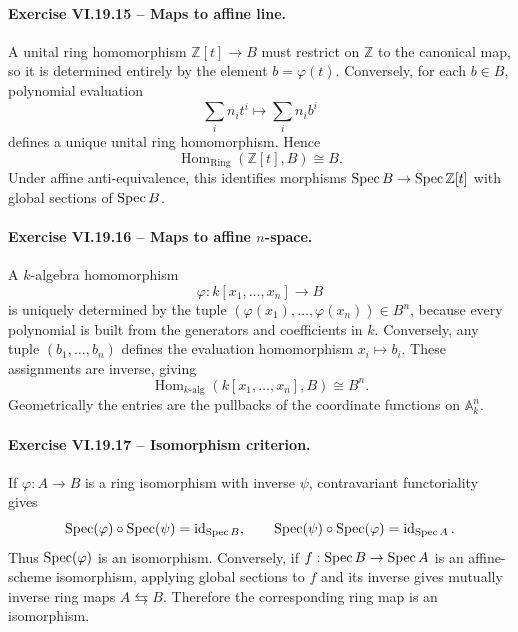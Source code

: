 \paragraph{Exercise VI.19.15 -- Maps to affine line.}
\begin{solution}
A unital ring homomorphism \(\mathbb Z[t]\to B\) must restrict on \(\mathbb Z\) to the canonical map, so it is determined entirely by the element \(b=\varphi(t)\).  Conversely, for each \(b\in B\), polynomial evaluation
\[
\sum_i n_i t^i\longmapsto\sum_i n_i b^i
\]
defines a unique unital ring homomorphism.  Hence
\[
\operatorname{Hom}_{\mathrm{Ring}}(\mathbb Z[t],B)\cong B.
\]
Under affine anti-equivalence, this identifies morphisms \(\operatorname{Spec} B\to\operatorname{Spec}\mathbb Z[t]\) with global sections of \(\operatorname{Spec} B\).
\end{solution}

\paragraph{Exercise VI.19.16 -- Maps to affine \(n\)-space.}
\begin{solution}
A \(k\)-algebra homomorphism
\[
\varphi:k[x_1,\ldots,x_n]\to B
\]
is uniquely determined by the tuple \((\varphi(x_1),\ldots,\varphi(x_n))\in B^n\), because every polynomial is built from the generators and coefficients in \(k\).  Conversely, any tuple \((b_1,\ldots,b_n)\) defines the evaluation homomorphism \(x_i\mapsto b_i\).  These assignments are inverse, giving
\[
\operatorname{Hom}_{k\text{-alg}}(k[x_1,\ldots,x_n],B)\cong B^n.
\]
Geometrically the entries are the pullbacks of the coordinate functions on \(\mathbb A_k^n\).
\end{solution}

\paragraph{Exercise VI.19.17 -- Isomorphism criterion.}
\begin{solution}
If \(\varphi:A\to B\) is a ring isomorphism with inverse \(\psi\), contravariant functoriality gives
\[
\operatorname{Spec}(\varphi)\circ\operatorname{Spec}(\psi)=\operatorname{id}_{\operatorname{Spec} B},
\qquad
\operatorname{Spec}(\psi)\circ\operatorname{Spec}(\varphi)=\operatorname{id}_{\operatorname{Spec} A}.
\]
Thus \(\operatorname{Spec}(\varphi)\) is an isomorphism.  Conversely, if \(f:\operatorname{Spec} B\to\operatorname{Spec} A\) is an affine-scheme isomorphism, applying global sections to \(f\) and its inverse gives mutually inverse ring maps \(A\leftrightarrows B\).  Therefore the corresponding ring map is an isomorphism.
\end{solution}

